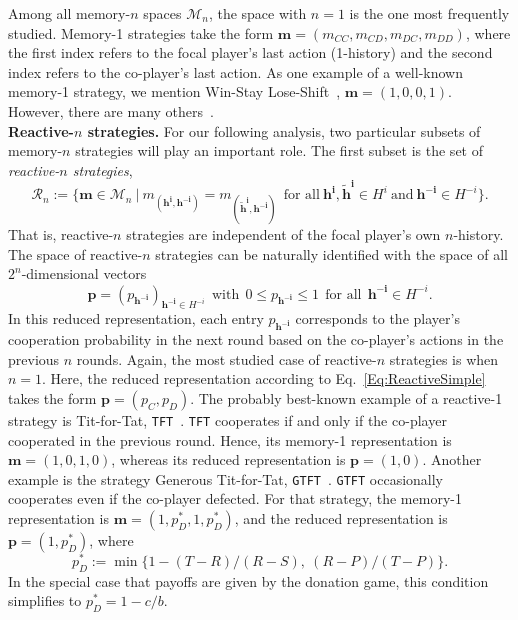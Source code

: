 \documentclass[11pt]{article}
\theoremstyle{plainCl1}
\theoremstyle{plainCl2}
\def\tft{\texttt{TFT}}
\def\gtft{\texttt{GTFT}}
\begin{document}
Among all memory-$n$ spaces $\mathcal{M}_n$, the space with $n\!=\!1$ is the one most frequently studied. 
Memory-1 strategies take the form $\mathbf{m}\!=\!(m_{CC}, m_{CD}, m_{DC}, m_{DD})$, where the first index refers to the focal player's last action (1-history) and the second index refers to the co-player's last action. 
As one example of a well-known memory-1 strategy, we mention Win-Stay Lose-Shift~\citep{nowak:Nature:1993}, $\mathbf{m}\!=\!(1,0,0,1)$. However, there are many others~\citep{hilbe:Nature:2018}.\\


\noindent
{\bfseries Reactive-$n$ strategies.} For our following analysis, two particular subsets of memory-$n$ strategies will play an important role. 
The first subset is the set of {\it reactive-$n$ strategies}, 
\begin{equation}
\mathcal{R}_n:=\Big\{ \mathbf{m}\!\in\!\mathcal{M}_n ~\Big|~ m_{(\mathbf{h^i},\mathbf{h^{-i}})}\!=\!m_{(\mathbf{\tilde{h}^i},\mathbf{h^{-i}})}~~\text{for all}~\mathbf{h^i}, \mathbf{\tilde{h}^i}\!\in\!H^i~\text{and}~\mathbf{h^{-i}}\!\in\!H^{-i}\Big\}.
\end{equation}
That is, reactive-$n$ strategies are independent of the focal player's own $n$-history. 
The space of \mbox{reactive-$n$} strategies can be naturally identified with the space of all $2^n$-dimensional vectors 
\begin{equation}\label{Eq:ReactiveSimple}
\mathbf{p}\!=\!(p_\mathbf{h^{-i}})_{\mathbf{h^{-i}}\in H^{-i}} ~~\text{with}~~ 0\!\le\!p_\mathbf{h^{-i}}\!\le\!1 ~~\text{for all}~~ \mathbf{h^{-i}}\!\in\! H^{-i}.
\end{equation}
In this reduced representation, each entry $p_{\mathbf{h^{-i}}}$ corresponds to the player's cooperation
probability in the next round based on the co-player's actions in the previous
$n$ rounds. 
Again, the most studied case of reactive-$n$ strategies is when $n\!=\!1$.
Here, the reduced representation according to Eq.~\eqref{Eq:ReactiveSimple} takes the form $\mathbf{p}\!=\!(p_C,p_D)$.
The probably best-known example of a reactive-1 strategy is Tit-for-Tat, \tft~\citep{axelrod:AAAS:1981}. 
\tft{} cooperates if and only if the co-player cooperated in the previous round. 
Hence, its memory-1 representation is $\mathbf{m}\!=\!(1,0,1,0)$, whereas its reduced representation is $\mathbf{p}\!=\!(1,0)$. 
Another example is the strategy Generous Tit-for-Tat, \gtft~\citep{nowak:Nature:1992,molander:jcr:1985}.
\gtft{} occasionally cooperates even if the co-player defected. 
For that strategy, the memory-1 representation is $\mathbf{m}\!=\!(1,p^*_D,1,p^*_D)$, and the reduced representation is $\mathbf{p}\!=\!(1,p^*_D)$, where 
\begin{equation} \label{Eq:ConditionGTFT}
p^*_D\!:=\!\min\big\{1\!-\!(T\!-\!R)/(R\!-\!S),~(R\!-\!P)/(T\!-\!P)\big\}.
\end{equation} 
In the special case that payoffs are given by the donation game, this condition simplifies to $p^*_D\!=\!1-c/b$.\\
\end{document}
